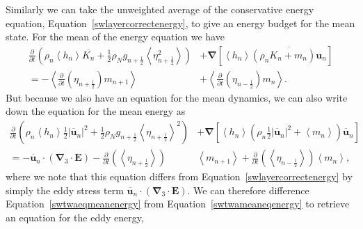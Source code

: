 \documentclass[12pt,a4paper]{report}
\newcommand*\thkmean[1]{\overline{#1}}
\newcommand*\nthkmean[1]{\left\langle{#1}\right\rangle}
\newcommand*\equref[1]{Equation~\eqref{#1}}
\newcommand*{\half}{\frac{1}{2}}
\begin{document}
    Similarly we can take the unweighted average of the
    conservative energy equation, \equref{swlayercorrectenergy}, to give an energy
    budget for the mean state. For the mean of the
    energy equation we have
    \begin{equation}
    \begin{split}
        \frac{\partial}{\partial t}\left(\rho_{n} \nthkmean{h_{n}} \thkmean{K_{n}}+ 
        \half \rho_{N} g_{n+\half }\nthkmean{\eta_{n+\half }^{2}} \right)
        &+\boldsymbol{\nabla} \left[\nthkmean{h_{n}} \thkmean{\left(\rho_{n}K_{n}+m_{n}\right) \boldsymbol{u}_{n}}\right] \\
        =- \nthkmean{\frac{\partial}{\partial t}\left(\eta_{n+\half }\right)   m_{n+1}}
        &+ \nthkmean{\frac{\partial}{\partial t}\left(\eta_{n-\half }\right) m_{n}}.
      \end{split}
                    \label{swtwameaneqenergy}
    \end{equation}
    But because we also have an equation for the mean dynamics, we
    can also write down the equation for the mean energy as
    \begin{equation}
        \begin{split}
        \frac{\partial}{\partial t}\left(\rho_{n} \nthkmean{h_{n}} \half \left|\thkmean{\boldsymbol{u}}_{n}\right|^{2}+ 
        \half \rho_{N} g_{n+\half }\nthkmean{\eta_{n+\half }}^{2} \right) &+\boldsymbol{\nabla} \left[\nthkmean{h_{n}} \left(\rho_{n}\half \left|\thkmean{\boldsymbol{u}}_{n}\right|^{2}+\nthkmean{m_{n}}\right) \thkmean{\boldsymbol{u}}_{n}\right] \\
        =-\thkmean{\boldsymbol{u}}_{n} \cdot \left(\boldsymbol{\nabla}_{3}\cdot \boldsymbol{E}\right)- \frac{\partial}{\partial t}\left(\nthkmean{\eta_{n+\half }}\right) &  \nthkmean{m_{n+1}}
        + \frac{\partial}{\partial t}\left(\nthkmean{\eta_{n-\half }}\right) \nthkmean{m_{n}},
              \end{split}
              \label{swtwaeqmeanenergy}
    \end{equation}
    where we note that this equation differs from \equref{swlayercorrectenergy} by simply the eddy stress
    term $\thkmean{\boldsymbol{u}}_{n} \cdot \left(\boldsymbol{\nabla}_{3}\cdot \boldsymbol{E}\right)$.
    We can therefore difference \equref{swtwaeqmeanenergy} from
    \equref{swtwameaneqenergy} to retrieve an equation
    for the eddy energy,
\end{document}

